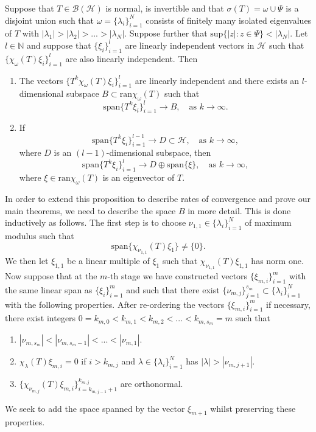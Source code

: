 \documentclass[a4paper,10pt]{article}
\begin{document}
\begin{proposition}\label{subspace}
Suppose that $T\in\mathcal{B}(\mathcal{H})$ is normal, is invertible and that $\sigma(T)=\omega\cup\Psi$ is a disjoint union such that $\omega=\{\lambda_i\}_{i=1}^N$ consists of finitely many isolated eigenvalues of $T$ with $\left|\lambda_1\right|>\left|\lambda_2\right|>...>\left|\lambda_N\right|$. Suppose further that $\mathrm{sup}\{\left|z\right|:z\in\Psi\}<\left|\lambda_N\right|$. Let $l\in \mathbb{N}$ and suppose that $\{\xi_i\}_{i=1}^l$ are linearly independent vectors in $\mathcal{H}$ such that $\{\chi_{\omega}(T)\xi_i\}_{i=1}^l$ are also linearly independent. Then
\begin{enumerate}
	\item[(i)] The vectors $\{T^k\chi_{\omega}(T)\xi_i\}_{i=1}^l$ are linearly independent and there exists an $l$-dimensional subspace $B\subset\mathrm{ran}\chi_{\omega}(T)$ such that
	$$
	\mathrm{span}\{T^k\xi_i\}_{i=1}^l\rightarrow B,\quad \text{as }k\rightarrow\infty.
	$$
	\item[(ii)] If
	$$
	\mathrm{span}\{T^k\xi_i\}_{i=1}^{l-1}\rightarrow D\subset\mathcal{H},\quad \text{as }k\rightarrow\infty,
	$$
	where $D$ is an $(l-1)$-dimensional subspace, then
	$$
  \mathrm{span}\{T^k
  \xi_i\}_{i=1}^l \rightarrow D \oplus
  \mathrm{span}\{\xi\},  \quad \text{as }k\rightarrow \infty,
  $$ 
where $\xi \in \mathrm{ran}\chi_{\omega}(T)$ is an eigenvector of $T$. 
\end{enumerate}
\end{proposition}


In order to extend this proposition to describe rates of convergence and prove our main theorems, we need to describe the space $B$ in more detail. This is done inductively as follows. The first step is to choose $\nu_{1,1}\in \{\lambda_i\}_{i=1}^N$ of maximum modulus such that
$$
\mathrm{span}\{\chi_{\nu_{1,1}}(T)\xi_1\} \neq \{0\}.
$$
We then let $\xi_{1,1}$ be a linear multiple of $\xi_1$ such that $\chi_{\nu_{1,1}}(T)\xi_{1,1}$ has norm one. Now suppose that at the $m$-th stage we have constructed vectors $\{\xi_{m,i}\}_{i=1}^m$ with the same linear span as $\{\xi_{i}\}_{i=1}^m$ and such that there exist $\{\nu_{m,j}\}_{j=1}^{s_m}\subset \{\lambda_i\}_{i=1}^N$ with the following properties. After re-ordering the vectors $\{\xi_{m,i}\}_{i=1}^m$ if necessary, there exist integers $0=k_{m,0}<k_{m,1}<k_{m,2}<...<k_{m,s_m}=m$ such that
\begin{enumerate}
	\item[(1)] $\left|\nu_{m,s_m}\right|<\left|\nu_{m,s_m-1}\right|<...<\left|\nu_{m,1}\right|.$
	\item[(2)] $\chi_{\lambda}(T)\xi_{m,i}=0$ if $i>k_{m,j}$ and $\lambda\in\{\lambda_i\}_{i=1}^N$ has $\left|\lambda\right|>\left|\nu_{m,j+1}\right|$.
	\item[(3)] $\{\chi_{\nu_{m,j}}(T)\xi_{m,i}\}_{i=k_{m,j-1}+1}^{k_{m,j}}$ are orthonormal.
\end{enumerate}
We seek to add the space spanned by the vector $\xi_{m+1}$ whilst preserving these properties.
\end{document}
